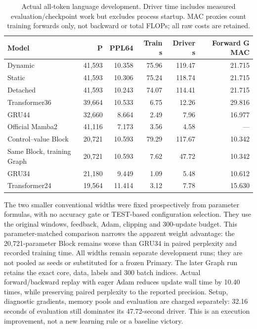 \begin{table}[t]
\centering\small
\begin{tabular}{lrrrrr}
\toprule
Model &P&PPL64&Train s&Driver s&Forward G MAC\\
\midrule
Dynamic &41,593&10.358&75.96&119.47&21.715\\
Static &41,593&10.306&75.24&118.74&21.715\\
Detached &41,593&10.243&74.07&114.41&21.715\\
Transformer36 &39,664&10.533&6.75&12.26&29.816\\
GRU44 &32,660&8.664&2.49&7.96&16.977\\
Official Mamba2 &41,116&7.173&3.56&4.58&---\\
Control--value Block &20,721&10.593&79.29&117.67&10.342\\
Same Block, training Graph &20,721&10.593&7.62&47.72&10.342\\
GRU34 &21,180&9.449&1.09&5.48&10.612\\
Transformer24 &19,564&11.414&3.12&7.78&15.630\\
\bottomrule
\end{tabular}
\caption{Actual all-token language development. Driver time includes measured
evaluation/checkpoint work but excludes process startup. MAC proxies count
training forwards only, not backward or total FLOPs; all raw costs are retained.}
\label{tab:development-ar-cost}
\end{table}

The two smaller conventional widths were fixed prospectively from parameter
formulas, with no accuracy gate or TEST-based configuration selection.
They use the original windows, feedback, Adam, clipping and 300-update budget.
This parameter-matched comparison narrows the apparent weight advantage:
the 20,721-parameter Block remains worse than GRU34 in paired perplexity and
recorded training time. All widths remain separate development runs;
they are not pooled as seeds or substituted for a frozen Primary.
The later Graph run retains the exact core, data, labels and 300 batch indices.
Actual forward/backward replay with eager Adam reduces update wall time by
10.40 times, while preserving paired perplexity to the reported precision.
Setup, diagnostic gradients, memory pools and evaluation are charged separately:
32.16 seconds of evaluation still dominates its 47.72-second driver.
This is an execution improvement, not a new learning rule or a baseline victory.

